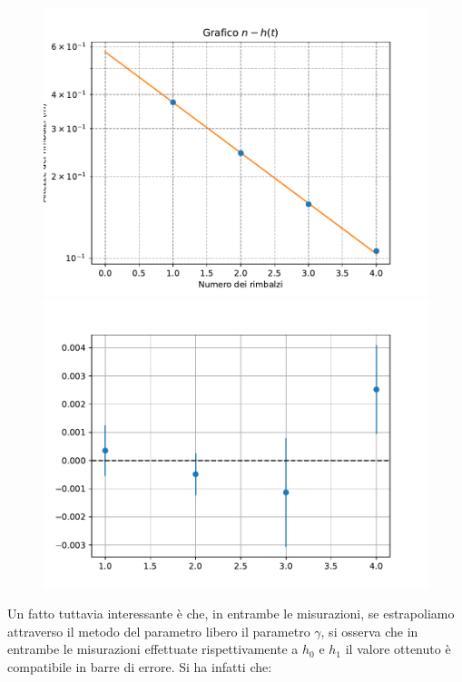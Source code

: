 \documentclass{article}
\begin{document}
\begin{figure}[h!]
	\centering
	\includegraphics[scale=0.50]{Grafico_n-h(t)_(1).pdf}
	\includegraphics[scale=0.50]{Grafico_residui_(1).pdf}
\end{figure}
Un fatto tuttavia interessante è che, in entrambe le misurazioni, se estrapoliamo attraverso il metodo del parametro libero il parametro $\gamma$, si osserva che in entrambe le misurazioni effettuate rispettivamente a $h_0$ e $h_1$ il valore ottenuto è compatibile in barre di errore. Si ha infatti che:
\end{document}
